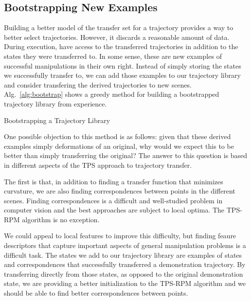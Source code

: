 \subsection{Bootstrapping New Examples}
Building a better model of the transfer set for a trajectory provides a way
to better select trajectories. However, it discards a reasonable amount of
data. During execution, have access to the transferred trajectories in addition
to the states they were transferred to. In some sense, these are new examples of 
successful manipulations in their own right. Instead of simply storing
the states we successfully transfer to, we can add those examples to our trajectory 
library and consider transfering the derived trajectories to new scenes. 
Alg.~\ref{alg:bootstrap} shows a greedy method for building a bootstrapped trajectory
library from experience.

\begin{algorithm}[H]
        
 \caption{Bootstrapping a Trajectory Library}
 \label{alg:bootstrap}
\end{algorithm}

One possible objection to this method is as follows: given that these derived examples
simply deformations of an original, why would we expect this to be better than simply
transferring the original? The answer to this question is based in different
aspects of the TPS approach to trajectory transfer.

The first is that, in addition to finding a transfer function that minimizes curvature,
we are also finding correspondences between points in the different scenes. Finding 
correspondences is a difficult and well-studied problem in computer vision and the best
approaches are subject to local optima. The TPS-RPM algorithm is no exception. 

We could appeal to local features to improve this difficulty, but finding feaure descriptors 
that capture important aspects of general manipulation problems is a difficult task. The
states we add to our trajectory library are examples of states and correspondences that 
successfully transferred a demonstration trajectory. By transferring directly from those
states, as opposed to the original demonstration state, we are providing a better 
initialization to the TPS-RPM algorithm and we should be able to find better correspondences
between points.

